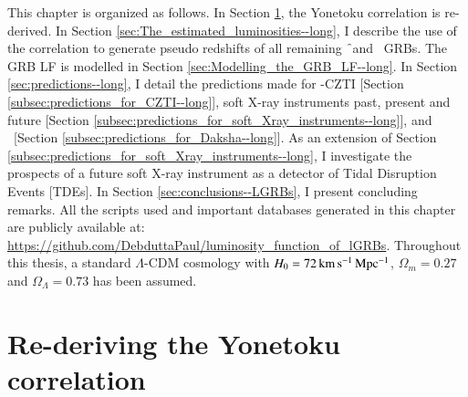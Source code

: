 This chapter is organized as follows. In Section \ref{sec:Yonetoku_correlation--long}, the Yonetoku correlation is re-derived. In Section \ref{sec:The_estimated_luminosities--long}, I describe the use of the correlation to generate pseudo redshifts of all remaining \f\ and \s\ GRBs. The GRB LF is modelled in Section \ref{sec:Modelling_the_GRB_LF--long}. In Section \ref{sec:predictions--long}, I detail the predictions made for \AS -CZTI [Section \ref{subsec:predictions_for_CZTI--long}], soft X-ray instruments past, present and future [Section \ref{subsec:predictions_for_soft_Xray_instruments--long}], and \D\ [Section \ref{subsec:predictions_for_Daksha--long}]. As an extension of Section \ref{subsec:predictions_for_soft_Xray_instruments--long}, I investigate the prospects of a future soft X-ray instrument as a detector of Tidal Disruption Events [TDEs]. In Section \ref{sec:conclusions--LGRBs}, I present concluding remarks. All the scripts used and important databases generated in this chapter are publicly available at: \url{https://github.com/DebduttaPaul/luminosity_function_of_lGRBs}. Throughout this thesis, a standard $\Lambda$-CDM cosmology with $H_0 = 72 \, \rm{km \, s^{-1} \, Mpc^{-1}}$, $\Omega_m = 0.27$ and $\Omega_{\Lambda} = 0.73$ has been assumed.


\section{Re-deriving the Yonetoku correlation}
\label{sec:Yonetoku_correlation--long}

